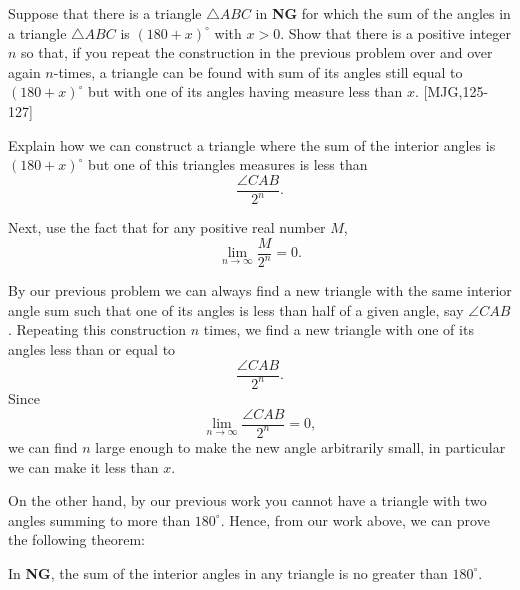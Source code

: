 \documentclass{ximera}
\begin{document}
\begin{problem}
\label{121} Suppose that there is a triangle $\triangle ABC$ in
\textbf{NG} for which the sum of the angles in a triangle $\triangle
ABC$ is $\left( 180+x\right)^\circ$ with $x>0$. Show that there is a
positive integer $n$ so that, if you repeat the construction in the
previous problem over and over again $n$-times, a triangle can be
found with sum of its angles still equal to $\left(180+x\right)^\circ$
but with one of its angles having measure less than $x$. [MJG,125-127]


\begin{hint}
Explain how we can construct a triangle where the sum of the interior
angles is $(180+x)^\circ$ but one of this triangles measures is less than
\[
\frac{\angle CAB}{2^n}.
\]
\end{hint}
\begin{hint}
Next, use the fact that for any positive real number $M$,
\[
\lim_{n\to \infty}\frac{M}{2^n} = 0.
\]
\end{hint}
\begin{freeResponse}
By our previous problem we can always find a new triangle with the
same interior angle sum such that one of its angles is less than half
of a given angle, say $\angle CAB$. Repeating this construction $n$
times, we find a new triangle with one of its angles less than or
equal to
\[
\frac{\angle CAB}{2^n}.
\]
Since 
\[
\lim_{n\to \infty}\frac{\angle CAB}{2^n} = 0,
\]
we can find $n$ large enough to make the new angle arbitrarily small, in
particular we can make it less than $x$.
\end{freeResponse}

\end{problem}


On the other hand, by our previous work%
you cannot have a triangle with two angles summing to more than
$180^\circ$. Hence, from our work above, we can prove the following
theorem:

\begin{theorem}
In \textbf{NG}, the sum of the interior angles in any triangle is no greater
than $180^\circ$.
\end{theorem}
\end{document}
